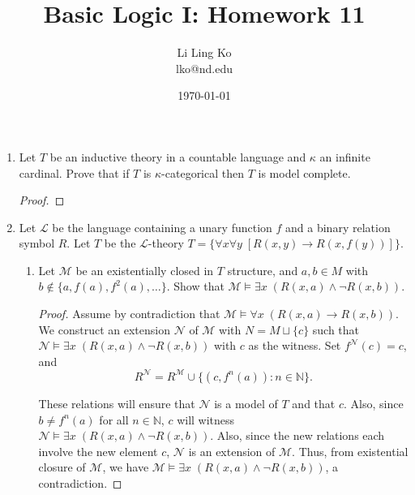 \documentclass{article}
\begin{document}
\title{Basic Logic I: Homework 11}
\author{Li Ling Ko\\ lko@nd.edu}
\date{\today}
\maketitle

\begin{enumerate}[label={\bf Q\arabic*:}]
  \item Let $T$ be an inductive theory in a countable language and $\kappa$
    an infinite cardinal. Prove that if $T$ is $\kappa$-categorical then
    $T$ is model complete.

    \begin{proof}
    \end{proof}

  \item Let $\mathcal{L}$ be the language containing a unary function $f$
    and a binary relation symbol $R$. Let $T$ be the $\mathcal{L}$-theory
    $T=\{\forall x\forall y\; [R(x,y)\rightarrow R(x,f(y))]\}$.

    \begin{enumerate}
      \item Let $\mathcal{M}$ be an existentially closed in $T$ structure,
        and $a,b\in M$ with $b\not\in\{a,f(a),f^2(a),\ldots\}$. Show that
        $\mathcal{M}\models \exists x\; (R(x,a)\wedge\neg R(x,b))$.

        \begin{proof}
          Assume by contradiction that $\mathcal{M}\models \forall x\;
          (R(x,a)\rightarrow R(x,b))$. We construct an extension
          $\mathcal{N}$ of $\mathcal{M}$ with $N=M\sqcup\{c\}$
          such that $\mathcal{N}\models \exists x\; (R(x,a)\wedge\neg
          R(x,b))$ with $c$ as the witness. Set $f^\mathcal{N}(c)=c$, and
          \[R^\mathcal{N}= R^\mathcal{M} \cup
          \{(c,f^n(a)):n\in\mathbb{N}\}.\]

          These relations will ensure that $\mathcal{N}$ is a model of $T$
          and that $c$. Also, since $b\neq f^n(a)$ for all
          $n\in\mathbb{N}$, $c$ will witness $\mathcal{N}\models \exists x\;
          (R(x,a)\wedge\neg R(x,b))$. Also, since the new relations each
          involve the new element $c$, $\mathcal{N}$ is an extension of
          $\mathcal{M}$. Thus, from existential closure of $\mathcal{M}$,
          we have $\mathcal{M}\models \exists x\; (R(x,a)\wedge\neg
          R(x,b))$, a contradiction.
        \end{proof}


\end{enumerate}
\end{enumerate}
\end{document}
